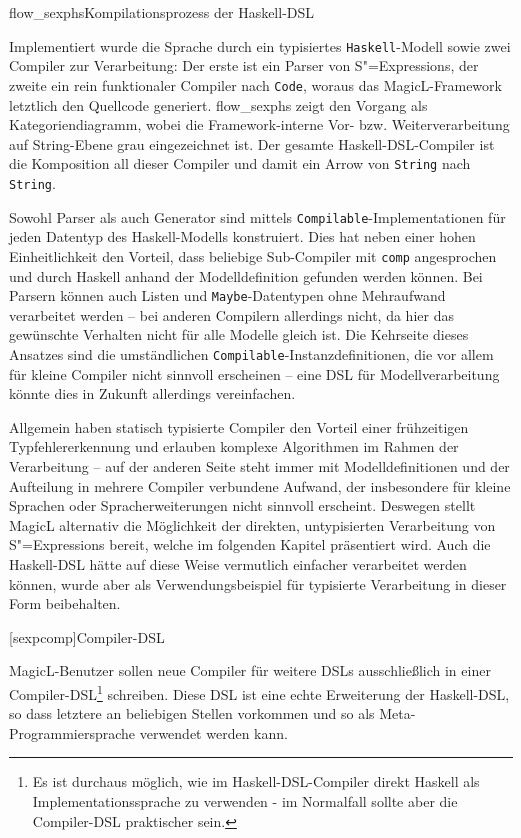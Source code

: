 \documentclass[12pt, a4paper, bibgerm]{scrbook}
\newcommand\icode[1]{\lstinline?#1?}
\newcommand\lchapter{}
\newcommand\abb{}
\newcommand\fig{}
\newcommand{\sexps}{S"=Expressions}
\begin{document}
\fig{flow_sexphs}{Kompilationsprozess der Haskell-DSL}

Implementiert wurde die Sprache durch ein typisiertes
\icode{Haskell}-Modell sowie zwei Compiler zur Verarbeitung: Der erste
ist ein Parser von \sexps{}, der zweite ein rein funktionaler Compiler
nach \icode{Code}, woraus das MagicL-Framework letztlich den Quellcode
generiert. \abb{flow_sexphs} zeigt den Vorgang als Kategoriendiagramm,
wobei die Framework-interne Vor- bzw. Weiterverarbeitung auf
String-Ebene grau eingezeichnet ist. Der gesamte
Haskell-DSL-Compiler ist die Komposition all dieser Compiler und
damit ein Arrow von \icode{String} nach \icode{String}.

Sowohl Parser als auch Generator sind mittels
\icode{Compilable}-Implementationen für jeden Datentyp des
Haskell-Modells konstruiert. Dies hat neben einer hohen Einheitlichkeit
den Vorteil, dass beliebige Sub-Compiler mit \icode{comp} angesprochen
und durch Haskell anhand der Modelldefinition gefunden werden
können. Bei Parsern können auch Listen und \icode{Maybe}-Datentypen ohne
Mehraufwand verarbeitet werden -- bei anderen Compilern allerdings nicht,
da hier das gewünschte Verhalten nicht für alle Modelle gleich ist. Die
Kehrseite dieses Ansatzes sind die umständlichen
\icode{Compilable}-Instanzdefinitionen, die vor allem für kleine
Compiler nicht sinnvoll erscheinen -- eine DSL für Modellverarbeitung
könnte dies in Zukunft allerdings vereinfachen.

Allgemein haben statisch typisierte Compiler den Vorteil einer
frühzeitigen Typfehlererkennung und erlauben komplexe Algorithmen im
Rahmen der Verarbeitung -- auf der anderen Seite steht immer mit
Modelldefinitionen und der Aufteilung in mehrere Compiler verbundene
Aufwand, der insbesondere für kleine Sprachen oder Spracherweiterungen
nicht sinnvoll erscheint. Deswegen stellt MagicL alternativ die
Möglichkeit der direkten, untypisierten Verarbeitung von \sexps{}
bereit, welche im folgenden Kapitel präsentiert wird. Auch die
Haskell-DSL hätte auf diese Weise vermutlich einfacher verarbeitet
werden können, wurde aber als Verwendungsbeispiel für typisierte
Verarbeitung in dieser Form beibehalten.

\lchapter[sexpcomp]{Compiler-DSL}

MagicL-Benutzer sollen neue Compiler für weitere DSLs ausschließlich in
einer Compiler-DSL\footnote{Es ist durchaus möglich, wie im
  Haskell-DSL-Compiler direkt Haskell als Implementationssprache zu
  verwenden - im Normalfall sollte aber die Compiler-DSL praktischer
  sein.} schreiben. Diese DSL ist eine echte Erweiterung der
Haskell-DSL, so dass letztere an beliebigen Stellen vorkommen
und so als Meta-Programmiersprache verwendet werden kann.
\end{document}
